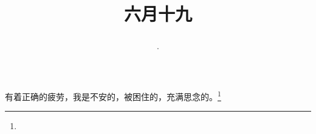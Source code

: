 \title{\date[d=24,m=7,y=2024][year:cn-y,年,month:cn,day:cn,日,·,weekday]·六月十九 }
有着正确的疲劳，我是不安的，被困住的，充满思念的。\footnote{ }


